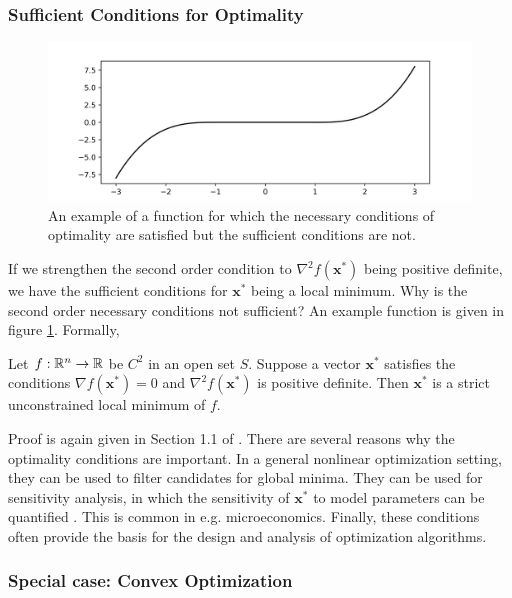 \subsubsection{Sufficient Conditions for Optimality}


\begin{figure}[t]
    \centering
    \includegraphics[width=0.7\linewidth]{figs/foc.png}
    \caption{An example of a function for which the necessary conditions of optimality are satisfied but the sufficient conditions are not.}
    \label{fig:foc}
\end{figure}


If we strengthen the second order condition to $\nabla^2 f(\bm{x}^*)$ being positive definite, we have the sufficient conditions for $\bm{x}^*$ being a local minimum. Why is the second order necessary conditions not sufficient? An example function is given in figure \ref{fig:foc}. Formally, 

\begin{theorem}
Let $f:\mathbb{R}^n \to \mathbb{R}$ be $C^2$ in an open set $S$. Suppose a vector $\bm{x}^*$ satisfies the conditions $\nabla f(\bm{x}^*) = 0$ and $\nabla^2 f(\bm{x}^*)$ is positive definite. Then $\bm{x}^*$ is a strict unconstrained local minimum of $f$. 
\end{theorem}

Proof is again given in Section 1.1 of \cite{bertsekas2016nonlinear}.
There are several reasons why the optimality conditions are important. In a general nonlinear optimization setting, they can be used to filter candidates for global minima. They can be used for sensitivity analysis, in which the sensitivity of $\bm{x}^*$ to model parameters can be quantified \cite{bertsekas2016nonlinear}. This is common in e.g. microeconomics. Finally, these conditions often provide the basis for the design and analysis of optimization algorithms.

\subsubsection{Special case: Convex Optimization}

